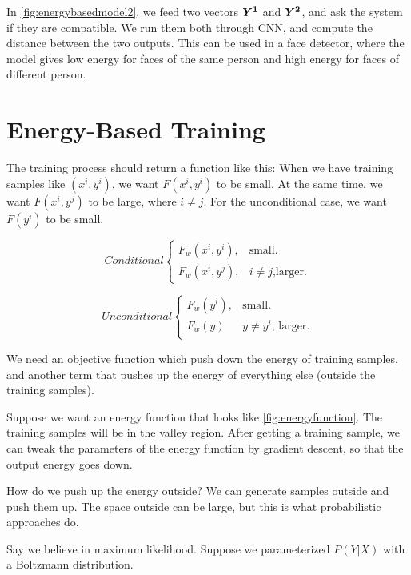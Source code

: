In \cref{fig:energybasedmodel2}, we feed two vectors $\vect{Y^1}$ and $\vect{Y^2}$, and ask the system if they are compatible. 
We run them both through CNN, and compute the distance between the two outputs. 
This can be used in a face detector, where the model gives low energy for faces of the same person and high energy for faces of different person.

\section{Energy-Based Training}
The training process should return a function like this: When we have training samples like $(x^i,y^i)$, we want $F(x^i,y^i)$ to be small. 
At the same time, we want $F(x^i,y^j)$ to be large, where $i \neq j$. 
For the unconditional case, we want $F(y^i)$ to be small.

\begin{equation*}
Conditional \begin{cases}
    F_w(x^i,y^i), & \text{small}.\\
    F_w(x^i,y^j), & \text{$i\neq j$,larger}.
    \end{cases}
\end{equation*}

\begin{equation*}
Unconditional \begin{cases}
    F_w(y^i), & \text{small}.\\
    F_w(y)& \text{$y\neq y^i$, larger}.\\
  \end{cases}
\end{equation*}

We need an objective function which push down the energy of training samples, and another term that pushes up the energy of everything else (outside the training samples). 

Suppose we want an energy function that looks like \cref{fig:energyfunction}. 
The training samples will be in the valley region. After getting a training sample, we can tweak the parameters of the energy function by gradient descent, so that the output energy goes down.

How do we push up the energy outside? 
We can generate samples outside and push them up. 
The space outside can be large, but this is what probabilistic approaches do.

Say we believe in maximum likelihood. 
Suppose we parameterized $P(Y|X)$ with a Boltzmann distribution.

